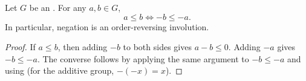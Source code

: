 \begin{proposition} \label{proposition:negation_reverses_order_in_ordered_group}
    Let $G$ be an . For any $a,b \in G$,
    $$a \le b \iff -b \le -a.$$
    In particular, negation is an order-reversing involution.
\end{proposition}
\begin{proof}
    If $a \le b$, then adding $-b$ to both sides gives $a - b \le 0$. Adding $-a$ gives $-b \le -a$. The converse follows by applying the same argument to $-b \le -a$ and using  (for the additive group, $-(-x) = x$).
\end{proof}